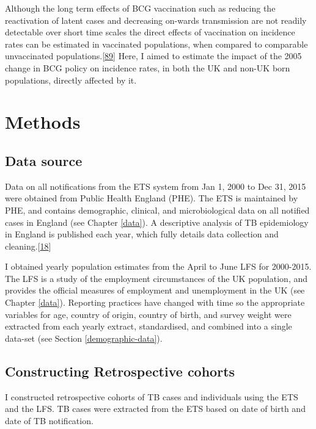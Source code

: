 \documentclass[11pt,twoside]{bristolthesis}
\begin{document}
  Although the long term effects of BCG vaccination such as reducing the reactivation of latent cases and decreasing on-wards transmission are not readily detectable over short time scales the direct effects of vaccination on incidence rates can be estimated in vaccinated populations, when compared to comparable unvaccinated populations.{[}\protect\hyperlink{ref-Parikh2016a}{89}{]} Here, I aimed to estimate the impact of the 2005 change in BCG policy on incidence rates, in both the UK and non-UK born populations, directly affected by it.
  
  \hypertarget{methods-1}{%
  \section{Methods}\label{methods-1}}
  
  \hypertarget{data-source}{%
  \subsection{Data source}\label{data-source}}
  
  Data on all notifications from the ETS system from Jan 1, 2000 to Dec 31, 2015 were obtained from Public Health England (PHE). The ETS is maintained by PHE, and contains demographic, clinical, and microbiological data on all notified cases in England (see Chapter \ref{data}). A descriptive analysis of TB epidemiology in England is published each year, which fully details data collection and cleaning.{[}\protect\hyperlink{ref-PHE2016a}{18}{]}
  
  I obtained yearly population estimates from the April to June LFS for 2000-2015. The LFS is a study of the employment circumstances of the UK population, and provides the official measures of employment and unemployment in the UK (see Chapter \ref{data}). Reporting practices have changed with time so the appropriate variables for age, country of origin, country of birth, and survey weight were extracted from each yearly extract, standardised, and combined into a single data-set (see Section \ref{demographic-data}).
  
  \hypertarget{constructing-retrospective-cohorts}{%
  \subsection{Constructing Retrospective cohorts}\label{constructing-retrospective-cohorts}}
  
  I constructed retrospective cohorts of TB cases and individuals using the ETS and the LFS. TB cases were extracted from the ETS based on date of birth and date of TB notification.
  
\end{document}
